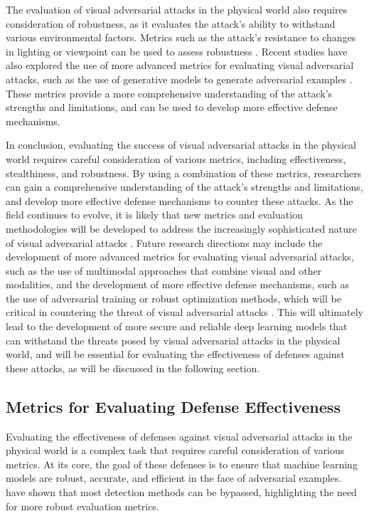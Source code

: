 \documentclass[11pt,a4paper]{article}
\begin{document}
The evaluation of visual adversarial attacks in the physical world also requires consideration of robustness, as it evaluates the attack's ability to withstand various environmental factors. Metrics such as the attack's resistance to changes in lighting or viewpoint can be used to assess robustness \cite{arxiv:2007.16118}. Recent studies have also explored the use of more advanced metrics for evaluating visual adversarial attacks, such as the use of generative models to generate adversarial examples \cite{doi:10.1109/cvpr46437.2021.01167}. These metrics provide a more comprehensive understanding of the attack's strengths and limitations, and can be used to develop more effective defense mechanisms.

In conclusion, evaluating the success of visual adversarial attacks in the physical world requires careful consideration of various metrics, including effectiveness, stealthiness, and robustness. By using a combination of these metrics, researchers can gain a comprehensive understanding of the attack's strengths and limitations, and develop more effective defense mechanisms to counter these attacks. As the field continues to evolve, it is likely that new metrics and evaluation methodologies will be developed to address the increasingly sophisticated nature of visual adversarial attacks \cite{doi:10.1109/tpami.2024.3430860}. Future research directions may include the development of more advanced metrics for evaluating visual adversarial attacks, such as the use of multimodal approaches that combine visual and other modalities, and the development of more effective defense mechanisms, such as the use of adversarial training or robust optimization methods, which will be critical in countering the threat of visual adversarial attacks \cite{doi:10.1007/s11633-019-1211-x}. This will ultimately lead to the development of more secure and reliable deep learning models that can withstand the threats posed by visual adversarial attacks in the physical world, and will be essential for evaluating the effectiveness of defenses against these attacks, as will be discussed in the following section.


\subsection{Metrics for Evaluating Defense Effectiveness}


Evaluating the effectiveness of defenses against visual adversarial attacks in the physical world is a complex task that requires careful consideration of various metrics. At its core, the goal of these defenses is to ensure that machine learning models are robust, accurate, and efficient in the face of adversarial examples. \cite{doi:10.1145/3128572.3140444} have shown that most detection methods can be bypassed, highlighting the need for more robust evaluation metrics. 
\end{document}
